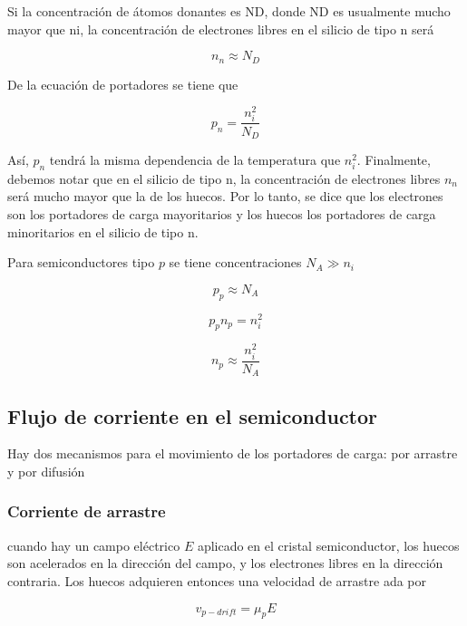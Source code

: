 Si la concentración de átomos donantes es ND, donde ND es usualmente mucho mayor que ni, la concentración de electrones libres en el silicio de tipo n será

\begin{equation*}
n_n \approx N_D
\end{equation*}

De la ecuación de portadores se tiene que 

\begin{equation*}
p_n = \frac{n_i^2}{N_D}
\end{equation*}

Así, $p_n$ tendrá la misma dependencia de la temperatura que $n_i^2$. Finalmente, debemos notar que en el silicio de tipo n, la concentración de electrones libres $n_n$ será mucho mayor que la de los huecos. Por lo tanto, se dice que los electrones son los portadores de carga mayoritarios y los huecos los portadores de carga minoritarios en el silicio de tipo n.

Para semiconductores tipo $p$ se tiene concentraciones $N_A \gg n_i$

\begin{equation*}
p_p \approx N_A
\end{equation*}

\begin{equation*}
p_p n_p = n_i^2
\end{equation*}

\begin{equation*}
n_p \approx \frac{n_i^2}{N_A}
\end{equation*}

\subsection{Flujo de corriente en el semiconductor}

Hay dos mecanismos para el movimiento de los portadores de carga: por arrastre y por difusión

\subsubsection{Corriente de arrastre}

cuando hay un campo eléctrico $E$ aplicado en el cristal semiconductor, los huecos son acelerados en la dirección del campo, y los electrones libres en la dirección contraria. Los huecos adquieren entonces una velocidad de arrastre ada por 

\begin{equation*}
v_{p-drift} = \mu_p E
\end{equation*}

